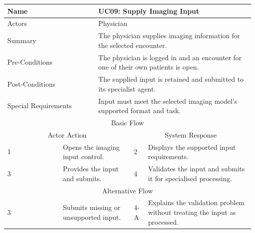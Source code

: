 \begin{reporttable}
\centering
\small
\caption{UC09: Supply Imaging Input.}
\label{tab:kashaf:uc09}
\begin{tabular}{|p{}|p{}|p{}|p{}|p{}|}
\hline
\multicolumn{2}{|p{\dimexpr0.225\textwidth+2\tabcolsep+\arrayrulewidth\relax}|}{Name} & \multicolumn{3}{p{\dimexpr0.575\textwidth+4\tabcolsep+2\arrayrulewidth\relax}|}{UC09: Supply Imaging Input} \\ \hline
\multicolumn{2}{|p{\dimexpr0.225\textwidth+2\tabcolsep+\arrayrulewidth\relax}|}{Actors} & \multicolumn{3}{p{\dimexpr0.575\textwidth+4\tabcolsep+2\arrayrulewidth\relax}|}{Physician} \\ \hline
\multicolumn{2}{|p{\dimexpr0.225\textwidth+2\tabcolsep+\arrayrulewidth\relax}|}{Summary} & \multicolumn{3}{p{\dimexpr0.575\textwidth+4\tabcolsep+2\arrayrulewidth\relax}|}{The physician supplies imaging information for the selected encounter.} \\ \hline
\multicolumn{2}{|p{\dimexpr0.225\textwidth+2\tabcolsep+\arrayrulewidth\relax}|}{Pre-Conditions} & \multicolumn{3}{p{\dimexpr0.575\textwidth+4\tabcolsep+2\arrayrulewidth\relax}|}{The physician is logged in and an encounter for one of their own patients is open.} \\ \hline
\multicolumn{2}{|p{\dimexpr0.225\textwidth+2\tabcolsep+\arrayrulewidth\relax}|}{Post-Conditions} & \multicolumn{3}{p{\dimexpr0.575\textwidth+4\tabcolsep+2\arrayrulewidth\relax}|}{The supplied input is retained and submitted to its specialist agent.} \\ \hline
\multicolumn{2}{|p{\dimexpr0.225\textwidth+2\tabcolsep+\arrayrulewidth\relax}|}{Special Requirements} & \multicolumn{3}{p{\dimexpr0.575\textwidth+4\tabcolsep+2\arrayrulewidth\relax}|}{Input must meet the selected imaging model's supported format and task.} \\ \hline
\multicolumn{5}{|c|}{Basic Flow} \\ \hline
\multicolumn{3}{|c|}{Actor Action} & \multicolumn{2}{c|}{System Response} \\ \hline
1 & \multicolumn{2}{p{\dimexpr0.37\textwidth+2\tabcolsep+\arrayrulewidth\relax}|}{Opens the imaging input control.} & 2 & Displays the supported input requirements. \\ \hline
3 & \multicolumn{2}{p{\dimexpr0.37\textwidth+2\tabcolsep+\arrayrulewidth\relax}|}{Provides the input and submits.} & 4 & Validates the input and submits it for specialised processing. \\ \hline
\multicolumn{5}{|c|}{Alternative Flow} \\ \hline
3 & \multicolumn{2}{p{\dimexpr0.37\textwidth+2\tabcolsep+\arrayrulewidth\relax}|}{Submits missing or unsupported input.} & 4-A & Explains the validation problem without treating the input as processed. \\ \hline
\end{tabular}
\end{reporttable}

